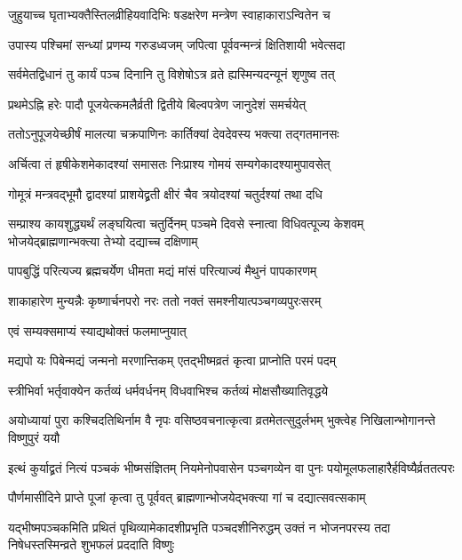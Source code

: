 \twolineshloka
{जुहुयाच्च घृताभ्यक्तैस्तिलव्रीहियवादिभिः}
{षडक्षरेण मन्त्रेण स्वाहाकाराऽन्वितेन च} %

\twolineshloka
{उपास्य पश्चिमां सन्ध्यां प्रणम्य गरुडध्वजम्}
{जपित्वा पूर्ववन्मन्त्रं क्षितिशायी भवेत्सदा} %

\twolineshloka
{सर्वमेतद्विधानं तु कार्यं पञ्च दिनानि तु}
{विशेषोऽत्र व्रते ह्यस्मिन्यदन्यूनं शृणुष्व तत्} %

\twolineshloka
{प्रथमेऽह्नि हरेः पादौ पूजयेत्कमलैर्व्रती}
{द्वितीये बिल्वपत्रेण जानुदेशं समर्चयेत्} %

\twolineshloka
{ततोऽनुपूजयेच्छीर्षं मालत्या चक्रपाणिनः}
{कार्तिक्यां देवदेवस्य भक्त्या तद्गतमानसः} %

\twolineshloka
{अर्चित्वा तं हृषीकेशमेकादश्यां समासतः}
{निःप्राश्य गोमयं सम्यगेकादश्यामुपावसेत्} %

\twolineshloka
{गोमूत्रं मन्त्रवद्भूमौ द्वादश्यां प्राशयेद्व्रती}
{क्षीरं चैव त्रयोदश्यां चतुर्दश्यां तथा दधि} %

\threelineshloka
{सम्प्राश्य कायशुद्ध्यर्थं लङ्घयित्वा चतुर्दिनम्}
{पञ्चमे दिवसे स्नात्वा विधिवत्पूज्य केशवम्}
{भोजयेद्ब्राह्मणान्भक्त्या तेभ्यो दद्याच्च दक्षिणाम्} %

\twolineshloka
{पापबुद्धिं परित्यज्य ब्रह्मचर्येण धीमता}
{मद्यं मांसं परित्याज्यं मैथुनं पापकारणम्} %

\twolineshloka
{शाकाहारेण मुन्यन्नैः कृष्णार्चनपरो नरः}
{ततो नक्तं समश्नीयात्पञ्चगव्यपुरःसरम्} %


\onelineshloka
{एवं सम्यक्समाप्यं स्याद्यथोक्तं फलमाप्नुयात्} %

\twolineshloka
{मद्यपो यः पिबेन्मद्यं जन्मनो मरणान्तिकम्}
{एतद्भीष्मव्रतं कृत्वा प्राप्नोति परमं पदम्} %

\twolineshloka
{स्त्रीभिर्वा भर्तृवाक्येन कर्तव्यं धर्मवर्धनम्}
{विधवाभिश्च कर्तव्यं मोक्षसौख्यातिवृद्धये} %

\threelineshloka
{अयोध्यायां पुरा कश्चिदतिथिर्नाम वै नृपः}
{वसिष्ठवचनात्कृत्वा व्रतमेतत्सुदुर्लभम्}
{भुक्त्वेह निखिलान्भोगानन्ते विष्णुपुरं ययौ} %

\threelineshloka
{इत्थं कुर्याद्व्रतं नित्यं पञ्चकं भीष्मसंज्ञितम्}
{नियमेनोपवासेन पञ्चगव्येन वा पुनः}
{पयोमूलफलाहारैर्हविष्यैर्व्रततत्परः} %

\twolineshloka
{पौर्णमासीदिने प्राप्ते पूजां कृत्वा तु पूर्ववत्}
{ब्राह्मणान्भोजयेद्भक्त्या गां च दद्यात्सवत्सकाम्} %

\twolineshloka
{यद्भीष्मपञ्चकमिति प्रथितं पृथिव्यामेकादशीप्रभृति पञ्चदशीनिरुद्धम्}
{उक्तं न भोजनपरस्य तदा निषेधस्तस्मिन्व्रते शुभफलं प्रददाति विष्णुः} %


